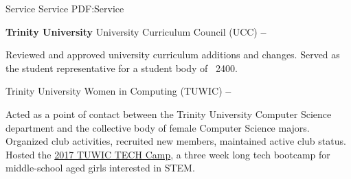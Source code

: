 \Section
{Service}
{Service}
{PDF:Service}

\Entry
\textbf{Trinity University}
\SubEntry
\Gap
University Curriculum Council (UCC)
\dotfill
\textbf{ -- }
\begin{Detail}
    \SubBulletItem
    Reviewed and approved university curriculum additions and changes.
    \SubBulletItem
    Served as the student representative for a student body of ~2400.
\end{Detail}

\SubEntry
\Gap
Trinity University Women in Computing (TUWIC)
\dotfill
\textbf{ -- }
\begin{Detail}
    \SubBulletItem
    Acted as a point of contact between the Trinity University Computer Science department and the collective body of female Computer Science majors.
    \SubBulletItem
    Organized club activities, recruited new members, maintained active club status.
    \SubBulletItem
    Hosted the \href{http://www.cs.trinity.edu/~tuwic/TECHcamp/}{2017 TUWIC TECH Camp}, a three week long tech bootcamp for middle-school aged girls interested in STEM.
\end{Detail}
